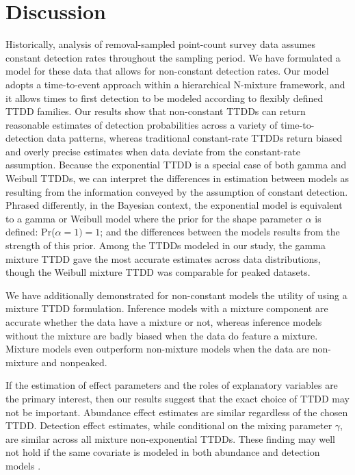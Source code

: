 \documentclass[useAMS,usenatbib,referee,12pt]{article}
\begin{document}
\section{Discussion} \label{sec:discuss}

Historically, analysis of removal-sampled point-count survey data assumes constant detection rates throughout the sampling period.  
We have formulated a model for these data that allows for non-constant detection rates.
Our model adopts a time-to-event approach within a hierarchical N-mixture framework, and it allows times to first detection to be modeled according to flexibly defined TTDD families.
Our results show that non-constant TTDDs can return reasonable estimates of detection probabilities across a variety of time-to-detection data patterns, whereas traditional constant-rate TTDDs return biased and overly precise estimates when data deviate from the constant-rate assumption.  
Because the exponential TTDD is a special case of both gamma and Weibull TTDDs, we can interpret the differences in estimation between models as resulting from the information conveyed by the assumption of constant detection.
Phrased differently, in the Bayesian context, the exponential model is equivalent to a gamma or Weibull model where the prior for the shape parameter $\alpha$ is defined: Pr($\alpha=1) = 1$; and the differences between the models results from the strength of this prior.
Among the TTDDs modeled in our study, the gamma mixture TTDD gave the most accurate estimates across data distributions, though the Weibull mixture TTDD was comparable for peaked datasets.  

We have additionally demonstrated for non-constant models the utility of using a mixture TTDD formulation.
Inference models with a mixture component are accurate whether the data have a mixture or not, whereas inference models without the mixture are badly biased when the data do feature a mixture.  
Mixture models even outperform non-mixture models when the data are non-mixture and nonpeaked.

If the estimation of effect parameters and the roles of explanatory variables are the primary interest, then our results suggest that the exact choice of TTDD may not be important.  
Abundance effect estimates are similar regardless of the chosen TTDD.
Detection effect estimates, while conditional on the mixing parameter $\gamma$, are similar across all mixture non-exponential TTDDs.  
These finding may well not hold if the same covariate is modeled in both abundance and detection models \citep{Kery2008}.
\end{document}
